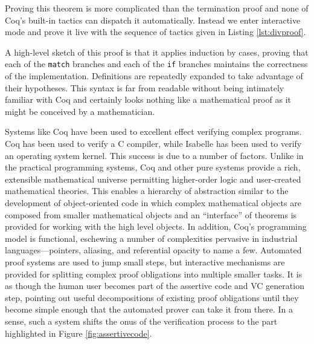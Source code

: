 

Proving this theorem is more complicated than the termination proof and none of Coq's built-in tactics can dispatch it automatically.  Instead we enter interactive mode and prove it live with the sequence of tactics given in Listing \ref{lst:divproof}.



A high-level sketch of this proof is that it applies induction by cases, proving that each of the \texttt{match} branches and each of the \texttt{if} branches maintains the correctness of the implementation.  Definitions are repeatedly expanded to take advantage of their hypotheses.  This syntax is far from readable without being intimately familiar with Coq and certainly looks nothing like a mathematical proof as it might be conceived by a mathematician.

Systems like Coq have been used to excellent effect verifying complex programs.  Coq has been used to verify a C compiler\cite{leroyVerifiedcompiler}, while Isabelle has been used to verify an operating system kernel\cite {kleinVerifiedOS}.  This success is due to a number of factors.  Unlike in the practical programming systems, Coq and other pure systems provide a rich, extensible mathematical universe permitting higher-order logic and user-created mathematical theories.  This enables a hierarchy of abstraction similar to the development of object-oriented code in which complex mathematical objects are composed from smaller mathematical objects and an ``interface'' of theorems is provided for working with the high level objects.  In addition, Coq's programming model is functional, eschewing a number of complexities pervasive in industrial languages---pointers, aliasing, and referential opacity to name a few.  Automated proof systems are used to jump small steps, but interactive mechanisms are provided for splitting complex proof obligations into multiple smaller tasks.  It is as though the human user becomes part of the assertive code and VC generation step, pointing out useful decompositions of existing proof obligations until they become simple enough that the automated prover can take it from there.  In a sense, such a system shifts the onus of the verification process to the part highlighted in Figure \ref{fig:assertivecode}.


